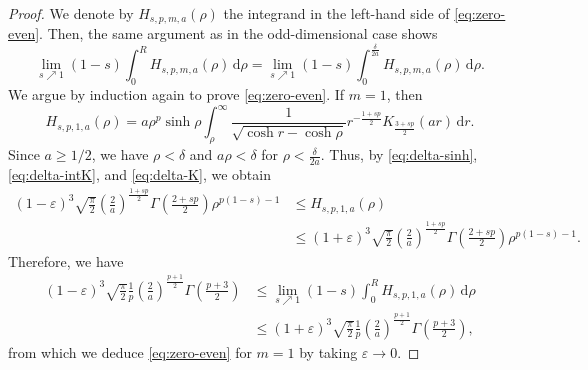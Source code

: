 \documentclass[10pt,a4paper]{amsart}
\begin{document}
\begin{proof}
We denote by $H_{s, p, m, a}(\rho)$ the integrand in the left-hand side of \eqref{eq:zero-even}. Then, the same argument as in the odd-dimensional case shows
\begin{equation*}
\lim_{s \nearrow 1} (1-s) \int_{0}^{R} H_{s, p, m, a}(\rho) \, \mathrm{d}\rho = \lim_{s \nearrow 1} (1-s) \int_{0}^{\frac{\delta}{2a}} H_{s, p, m, a}(\rho) \, \mathrm{d}\rho.
\end{equation*}
We argue by induction again to prove \eqref{eq:zero-even}. If $m=1$, then
\begin{equation*}
H_{s, p, 1, a}(\rho) = a \rho^{p} \sinh\rho \int_{\rho}^{\infty} \frac{1}{\sqrt{\cosh r - \cosh \rho}} r^{-\frac{1+sp}{2}} K_{\frac{3+sp}{2}}(ar) \, \mathrm{d}r.
\end{equation*}
Since $a \geq 1/2$, we have $\rho < \delta$ and $a\rho < \delta$ for $\rho < \frac{\delta}{2a}$. Thus, by \eqref{eq:delta-sinh}, \eqref{eq:delta-intK}, and \eqref{eq:delta-K}, we obtain
\begin{equation*}
\begin{split}
(1-\varepsilon)^{3} \sqrt{\frac{\pi}{2}} \left( \frac{2}{a} \right)^{\frac{1+sp}{2}} \Gamma\left( \frac{2+sp}{2} \right) \rho^{p(1-s)-1}
&\leq H_{s, p, 1, a}(\rho) \\
&\leq (1+\varepsilon)^{3} \sqrt{\frac{\pi}{2}} \left( \frac{2}{a} \right)^{\frac{1+sp}{2}} \Gamma\left( \frac{2+sp}{2} \right) \rho^{p(1-s)-1}.
\end{split}
\end{equation*}
Therefore, we have
\begin{equation*}
\begin{split}
(1-\varepsilon)^{3} \sqrt{\frac{\pi}{2}} \frac{1}{p} \left( \frac{2}{a} \right)^{\frac{p+1}{2}} \Gamma\left( \frac{p+3}{2} \right)
&\leq \lim_{s \nearrow 1} (1-s) \int_{0}^{R} H_{s, p, 1, a}(\rho) \, \mathrm{d}\rho \\
&\leq (1+\varepsilon)^{3} \sqrt{\frac{\pi}{2}} \frac{1}{p} \left( \frac{2}{a} \right)^{\frac{p+1}{2}} \Gamma\left( \frac{p+3}{2} \right),
\end{split}
\end{equation*}
from which we deduce \eqref{eq:zero-even} for $m=1$ by taking $\varepsilon \to 0$.


\end{proof}
\end{document}
